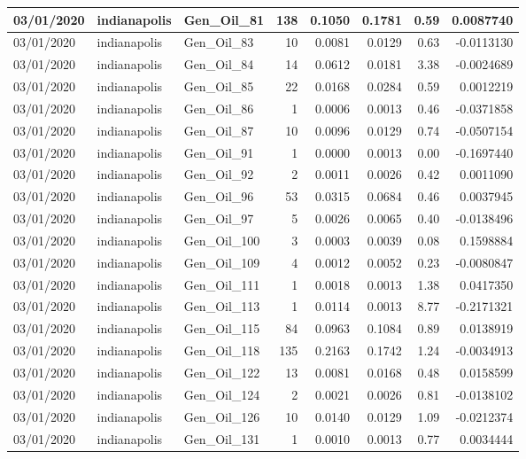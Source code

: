 \documentclass[
  letterpaper,
  DIV=11,
  numbers=noendperiod]{scrartcl}
\begin{document}
\begin{tabular}{l|l|l|r|r|r|r|r}
\hline
03/01/2020 & indianapolis & Gen\_Oil\_81 & 138 & 0.1050 & 0.1781 & 0.59 & 0.0087740\\
\hline
03/01/2020 & indianapolis & Gen\_Oil\_83 & 10 & 0.0081 & 0.0129 & 0.63 & -0.0113130\\
\hline
03/01/2020 & indianapolis & Gen\_Oil\_84 & 14 & 0.0612 & 0.0181 & 3.38 & -0.0024689\\
\hline
03/01/2020 & indianapolis & Gen\_Oil\_85 & 22 & 0.0168 & 0.0284 & 0.59 & 0.0012219\\
\hline
03/01/2020 & indianapolis & Gen\_Oil\_86 & 1 & 0.0006 & 0.0013 & 0.46 & -0.0371858\\
\hline
03/01/2020 & indianapolis & Gen\_Oil\_87 & 10 & 0.0096 & 0.0129 & 0.74 & -0.0507154\\
\hline
03/01/2020 & indianapolis & Gen\_Oil\_91 & 1 & 0.0000 & 0.0013 & 0.00 & -0.1697440\\
\hline
03/01/2020 & indianapolis & Gen\_Oil\_92 & 2 & 0.0011 & 0.0026 & 0.42 & 0.0011090\\
\hline
03/01/2020 & indianapolis & Gen\_Oil\_96 & 53 & 0.0315 & 0.0684 & 0.46 & 0.0037945\\
\hline
03/01/2020 & indianapolis & Gen\_Oil\_97 & 5 & 0.0026 & 0.0065 & 0.40 & -0.0138496\\
\hline
03/01/2020 & indianapolis & Gen\_Oil\_100 & 3 & 0.0003 & 0.0039 & 0.08 & 0.1598884\\
\hline
03/01/2020 & indianapolis & Gen\_Oil\_109 & 4 & 0.0012 & 0.0052 & 0.23 & -0.0080847\\
\hline
03/01/2020 & indianapolis & Gen\_Oil\_111 & 1 & 0.0018 & 0.0013 & 1.38 & 0.0417350\\
\hline
03/01/2020 & indianapolis & Gen\_Oil\_113 & 1 & 0.0114 & 0.0013 & 8.77 & -0.2171321\\
\hline
03/01/2020 & indianapolis & Gen\_Oil\_115 & 84 & 0.0963 & 0.1084 & 0.89 & 0.0138919\\
\hline
03/01/2020 & indianapolis & Gen\_Oil\_118 & 135 & 0.2163 & 0.1742 & 1.24 & -0.0034913\\
\hline
03/01/2020 & indianapolis & Gen\_Oil\_122 & 13 & 0.0081 & 0.0168 & 0.48 & 0.0158599\\
\hline
03/01/2020 & indianapolis & Gen\_Oil\_124 & 2 & 0.0021 & 0.0026 & 0.81 & -0.0138102\\
\hline
03/01/2020 & indianapolis & Gen\_Oil\_126 & 10 & 0.0140 & 0.0129 & 1.09 & -0.0212374\\
\hline
03/01/2020 & indianapolis & Gen\_Oil\_131 & 1 & 0.0010 & 0.0013 & 0.77 & 0.0034444\\

\end{tabular}
\end{document}
